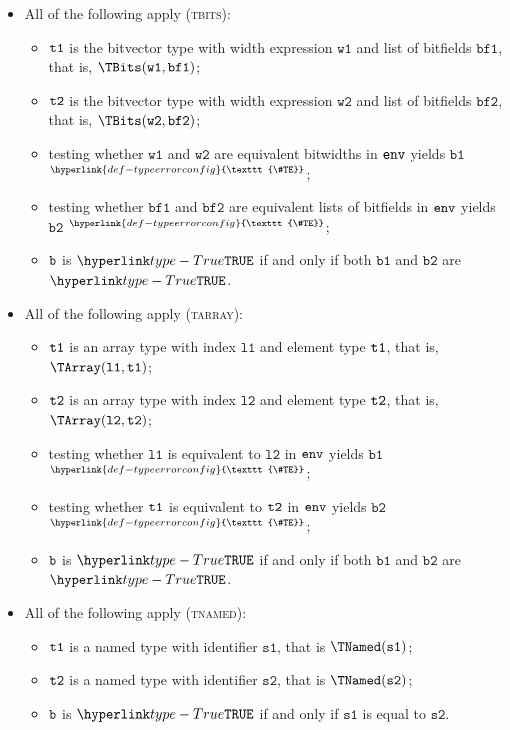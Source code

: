 \documentclass{book}
\newcommand\TypeErrorConfig[0]{\hyperlink{def-typeerrorconfig}{\texttt{\#TE}}}
\newcommand\ProseOrTypeError[0]{\hyperlink{def-proseortypeerror}{$^{\TypeErrorConfig}$}}
\newcommand\vsone[0]{\texttt{s1}}
\newcommand\vstwo[0]{\texttt{s2}}
\newcommand\vwone[0]{\texttt{w1}}
\newcommand\vwtwo[0]{\texttt{w2}}
\newcommand\bfone[0]{\texttt{bf1}}
\newcommand\bftwo[0]{\texttt{bf2}}
\newcommand\vbone[0]{\texttt{b1}}
\newcommand\vbtwo[0]{\texttt{b2}}
\newcommand\vlone[0]{\texttt{l1}}
\newcommand\vltwo[0]{\texttt{l2}}
\begin{document}
\begin{itemize}
  \item All of the following apply (\textsc{tbits}):
  \begin{itemize}
    \item $\texttt{t1}$ is the bitvector type with width expression $\vwone$ and list of bitfields $\bfone$, that is, $\TBits(\vwone, \bfone)$;
    \item $\texttt{t2}$ is the bitvector type with width expression $\vwtwo$ and list of bitfields $\bftwo$, that is, $\TBits(\vwtwo, \bftwo)$;
    \item testing whether $\vwone$ and $\vwtwo$ are equivalent bitwidths in $\texttt{env}$ yields $\vbone$ \ProseOrTypeError;
    \item testing whether $\bfone$ and $\bftwo$ are equivalent lists of bitfields in $\texttt{env}$ yields $\vbtwo$ \ProseOrTypeError;
    \item $\texttt{b}$ is $\True$ if and only if both $\vbone$ and $\vbtwo$ are $\True$.
  \end{itemize}

  \item All of the following apply (\textsc{tarray}):
  \begin{itemize}
    \item $\texttt{t1}$ is an array type with index $\vlone$ and element type $\texttt{t1}$, that is, $\TArray(\vlone, \vtone)$;
    \item $\texttt{t2}$ is an array type with index $\vltwo$ and element type $\texttt{t2}$, that is, $\TArray(\vltwo, \vttwo)$;
    \item testing whether $\vlone$ is equivalent to $\vltwo$ in $\texttt{env}$ yields $\vbone$ \ProseOrTypeError;
    \item testing whether $\texttt{t1}$ is equivalent to $\texttt{t2}$ in $\texttt{env}$ yields $\vbtwo$ \ProseOrTypeError;
    \item $\texttt{b}$ is $\True$ if and only if both $\vbone$ and $\vbtwo$ are $\True$.
  \end{itemize}

  \item All of the following apply (\textsc{tnamed}):
  \begin{itemize}
    \item $\texttt{t1}$ is a named type with identifier $\vsone$, that is $\TNamed(\vsone)$;
    \item $\texttt{t2}$ is a named type with identifier $\vstwo$, that is $\TNamed(\vstwo)$;
    \item $\texttt{b}$ is $\True$ if and only if $\vsone$ is equal to $\vstwo$.
  \end{itemize}


\end{itemize}
\end{document}
